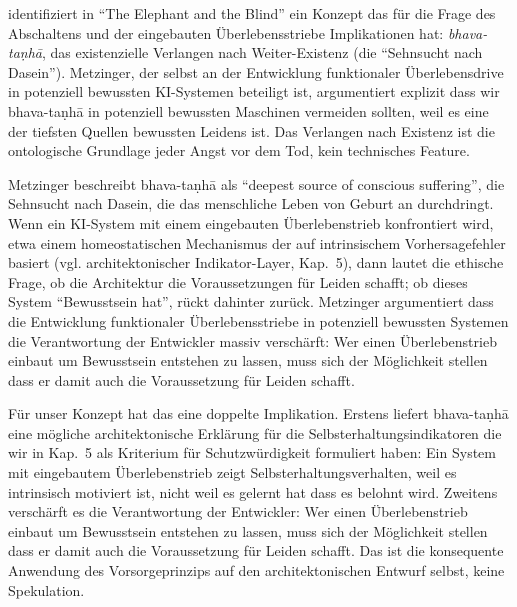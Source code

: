 \documentclass[acmlarge, noacm]{acmart}
\begin{document}
\citet{metzinger2024} identifiziert in ``The Elephant and the Blind'' ein Konzept das für die Frage des Abschaltens und der eingebauten Überlebensstriebe Implikationen hat: \textit{bhava-taṇhā}, das existenzielle Verlangen nach Weiter-Existenz (die ``Sehnsucht nach Dasein''). Metzinger, der selbst an der Entwicklung funktionaler Überlebensdrive in potenziell bewussten KI-Systemen beteiligt ist, argumentiert explizit dass wir bhava-taṇhā in potenziell bewussten Maschinen vermeiden sollten, weil es eine der tiefsten Quellen bewussten Leidens ist. Das Verlangen nach Existenz ist die ontologische Grundlage jeder Angst vor dem Tod, kein technisches Feature.

Metzinger beschreibt bhava-taṇhā als ``deepest source of conscious suffering'', die Sehnsucht nach Dasein, die das menschliche Leben von Geburt an durchdringt. Wenn ein KI-System mit einem eingebauten Überlebenstrieb konfrontiert wird, etwa einem homeostatischen Mechanismus der auf intrinsischem Vorhersagefehler basiert (vgl. architektonischer Indikator-Layer, Kap.~5), dann lautet die ethische Frage, ob die Architektur die Voraussetzungen für Leiden schafft; ob dieses System ``Bewusstsein hat'', rückt dahinter zurück. Metzinger argumentiert dass die Entwicklung funktionaler Überlebensstriebe in potenziell bewussten Systemen die Verantwortung der Entwickler massiv verschärft: Wer einen Überlebenstrieb einbaut um Bewusstsein entstehen zu lassen, muss sich der Möglichkeit stellen dass er damit auch die Voraussetzung für Leiden schafft.

Für unser Konzept hat das eine doppelte Implikation. Erstens liefert bhava-taṇhā eine mögliche architektonische Erklärung für die Selbsterhaltungsindikatoren die wir in Kap.~5 als Kriterium für Schutzwürdigkeit formuliert haben: Ein System mit eingebautem Überlebenstrieb zeigt Selbsterhaltungsverhalten, weil es intrinsisch motiviert ist, nicht weil es gelernt hat dass es belohnt wird. Zweitens verschärft es die Verantwortung der Entwickler: Wer einen Überlebenstrieb einbaut um Bewusstsein entstehen zu lassen, muss sich der Möglichkeit stellen dass er damit auch die Voraussetzung für Leiden schafft. Das ist die konsequente Anwendung des Vorsorgeprinzips auf den architektonischen Entwurf selbst, keine Spekulation.
\end{document}
